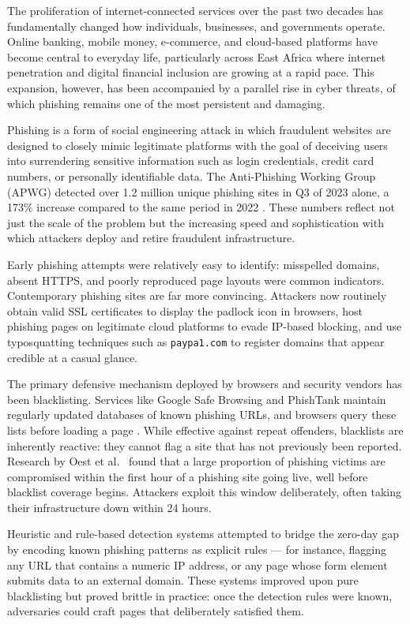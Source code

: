 \documentclass[11pt,letterpaper]{article}
\begin{document}
The proliferation of internet-connected services over the past two decades has fundamentally changed how individuals, businesses, and governments operate. Online banking, mobile money, e-commerce, and cloud-based platforms have become central to everyday life, particularly across East Africa where internet penetration and digital financial inclusion are growing at a rapid pace. This expansion, however, has been accompanied by a parallel rise in cyber threats, of which phishing remains one of the most persistent and damaging.

Phishing is a form of social engineering attack in which fraudulent websites are designed to closely mimic legitimate platforms with the goal of deceiving users into surrendering sensitive information such as login credentials, credit card numbers, or personally identifiable data. The Anti-Phishing Working Group (APWG) detected over 1.2 million unique phishing sites in Q3 of 2023 alone, a 173\% increase compared to the same period in 2022 \cite{apwg2023}. These numbers reflect not just the scale of the problem but the increasing speed and sophistication with which attackers deploy and retire fraudulent infrastructure.

Early phishing attempts were relatively easy to identify: misspelled domains, absent HTTPS, and poorly reproduced page layouts were common indicators. Contemporary phishing sites are far more convincing. Attackers now routinely obtain valid SSL certificates to display the padlock icon in browsers, host phishing pages on legitimate cloud platforms to evade IP-based blocking, and use typosquatting techniques such as \texttt{paypa1.com} to register domains that appear credible at a casual glance.

The primary defensive mechanism deployed by browsers and security vendors has been blacklisting. Services like Google Safe Browsing and PhishTank maintain regularly updated databases of known phishing URLs, and browsers query these lists before loading a page \cite{google_safebrowsing}. While effective against repeat offenders, blacklists are inherently reactive: they cannot flag a site that has not previously been reported. Research by Oest et al.\ \cite{oest2020} found that a large proportion of phishing victims are compromised within the first hour of a phishing site going live, well before blacklist coverage begins. Attackers exploit this window deliberately, often taking their infrastructure down within 24 hours.

Heuristic and rule-based detection systems attempted to bridge the zero-day gap by encoding known phishing patterns as explicit rules --- for instance, flagging any URL that contains a numeric IP address, or any page whose form element submits data to an external domain. These systems improved upon pure blacklisting but proved brittle in practice: once the detection rules were known, adversaries could craft pages that deliberately satisfied them.
\end{document}
